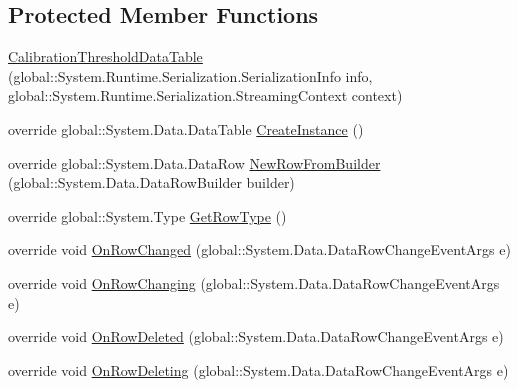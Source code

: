 \subsection*{Protected Member Functions}
\begin{DoxyCompactItemize}
\item 
\hyperlink{class_env_int_1_1_win32_1_1_field_tech_1_1_manager_1_1_data_sets_1_1_guide_ware_mobile_data_set_e4a98fb4b531becb042ae997c9d8a15c_a51a25c8d58a1b95b08b945fc3c6a77e7}{Calibration\+Threshold\+Data\+Table} (global\+::\+System.\+Runtime.\+Serialization.\+Serialization\+Info info, global\+::\+System.\+Runtime.\+Serialization.\+Streaming\+Context context)
\item 
override global\+::\+System.\+Data.\+Data\+Table \hyperlink{class_env_int_1_1_win32_1_1_field_tech_1_1_manager_1_1_data_sets_1_1_guide_ware_mobile_data_set_e4a98fb4b531becb042ae997c9d8a15c_ad1a69ac93bebcec5da577e24144250fe}{Create\+Instance} ()
\item 
override global\+::\+System.\+Data.\+Data\+Row \hyperlink{class_env_int_1_1_win32_1_1_field_tech_1_1_manager_1_1_data_sets_1_1_guide_ware_mobile_data_set_e4a98fb4b531becb042ae997c9d8a15c_a2b0773a63c112af4f9f081057e34ff7b}{New\+Row\+From\+Builder} (global\+::\+System.\+Data.\+Data\+Row\+Builder builder)
\item 
override global\+::\+System.\+Type \hyperlink{class_env_int_1_1_win32_1_1_field_tech_1_1_manager_1_1_data_sets_1_1_guide_ware_mobile_data_set_e4a98fb4b531becb042ae997c9d8a15c_ac55220449c0650049bdcd259fda915f1}{Get\+Row\+Type} ()
\item 
override void \hyperlink{class_env_int_1_1_win32_1_1_field_tech_1_1_manager_1_1_data_sets_1_1_guide_ware_mobile_data_set_e4a98fb4b531becb042ae997c9d8a15c_ac7dffce7242d2a411d9b45d87798a3fd}{On\+Row\+Changed} (global\+::\+System.\+Data.\+Data\+Row\+Change\+Event\+Args e)
\item 
override void \hyperlink{class_env_int_1_1_win32_1_1_field_tech_1_1_manager_1_1_data_sets_1_1_guide_ware_mobile_data_set_e4a98fb4b531becb042ae997c9d8a15c_a618ee2560dec8d7ce0c0b6fd8fd9d32e}{On\+Row\+Changing} (global\+::\+System.\+Data.\+Data\+Row\+Change\+Event\+Args e)
\item 
override void \hyperlink{class_env_int_1_1_win32_1_1_field_tech_1_1_manager_1_1_data_sets_1_1_guide_ware_mobile_data_set_e4a98fb4b531becb042ae997c9d8a15c_a65a47d9c51ded5bb5defeb018fee13ca}{On\+Row\+Deleted} (global\+::\+System.\+Data.\+Data\+Row\+Change\+Event\+Args e)
\item 
override void \hyperlink{class_env_int_1_1_win32_1_1_field_tech_1_1_manager_1_1_data_sets_1_1_guide_ware_mobile_data_set_e4a98fb4b531becb042ae997c9d8a15c_a88018397e967fc9a220293bbd434fafb}{On\+Row\+Deleting} (global\+::\+System.\+Data.\+Data\+Row\+Change\+Event\+Args e)

\end{DoxyCompactItemize}

